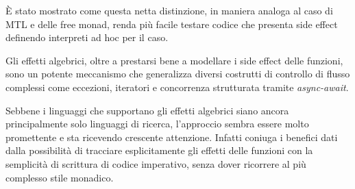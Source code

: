 È stato mostrato come questa netta distinzione, in maniera analoga al caso di MTL e delle free monad, renda più facile testare codice che presenta side effect definendo interpreti ad hoc per il caso.

Gli effetti algebrici, oltre a prestarsi bene a modellare i side effect delle funzioni, sono un potente meccanismo che generalizza diversi costrutti di controllo di flusso complessi come eccezioni, iteratori e concorrenza strutturata tramite \emph{async-await}.

Sebbene i linguaggi che supportano gli effetti algebrici siano ancora principalmente solo linguaggi di ricerca, l'approccio sembra essere molto promettente e sta ricevendo crescente attenzione. Infatti coniuga i benefici dati dalla possibilità di tracciare esplicitamente gli effetti delle funzioni con la semplicità di scrittura di codice imperativo, senza dover ricorrere al più complesso stile monadico.

